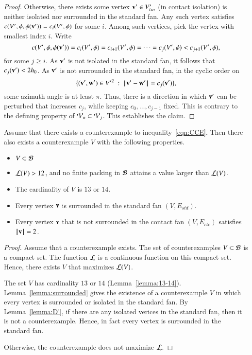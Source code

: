 \begin{proof}
 Otherwise,
there exists some vertex ${\mathbf v}'\in V'_{iso}$ (in contact isolation)
is neither isolated nor surrounded in the standard fan.  
Any such vertex satisfies $c(V',\phi,\phi({\mathbf v}'))=c_i(V',\phi)$ for some $i$.
Among such vertices, pick the vertex with smallest index
$i$.  Write 
$$
c(V',\phi,\phi({\mathbf v}')) = c_i(V',\phi) = c_{i+1}(V',\phi) =\cdots= c_j(V',\phi) < c_{j+1}(V',\phi),
$$
for some $j\ge i$.  As ${\mathbf v}'$ is not isolated in the
standard fan, it follows that $c_j({\mathbf v}') < 2{h_0}$.  As ${\mathbf v}'$ is not surrounded in the standard fan,
in the cyclic order on
$$
\{({\mathbf v}',{\mathbf w}')\in V'^2 \ :\  {\hskip0.1em|\hskip-0.15em|\hskip0.1em}{\mathbf v}' - {\mathbf w}'{\hskip0.1em|\hskip-0.15em|\hskip0.1em} = c_j({\mathbf v}')\},
$$
some azimuth angle is at least $\pi$.
Thus, there is a direction in which ${\mathbf v}'$ can be perturbed
that increases $c_j$, while keeping $c_0,\ldots,c_{j-1}$
fixed.  This is contrary to the defining property of
${\mathcal V}_n\subset{\mathcal V}_j$.  This establishes the claim.
%
\end{proof}



\begin{lemma}\label{lemma:CE} 
Assume that there exists a counterexample to inequality~\ref{eqn:CCE}.  Then there also exists a counterexample $V$ with the following properties.
\begin{itemize}
\item $V\subset {\mathcal B}$
\item ${\mathcal L}(V) > 12$, and no finite packing in ${\mathcal B}$ attains a value larger than ${\mathcal L}(V)$.
\item The cardinality of $V$ is $13$ or $14$.
\item Every vertex ${\mathbf v}$ is surrounded in the standard fan $(V,E_{std})$.
\item Every vertex ${\mathbf v}$ that is not surrounded in the contact
fan $(V,E_{ctc})$ satisfies ${{\hskip0.1em|\hskip-0.15em|\hskip0.1em}{\mathbf v}{\hskip0.1em|\hskip-0.15em|\hskip0.1em}}=2$.
\end{itemize}
\end{lemma}

\begin{proof}  Assume that a counterexample exists.
The set of counterexamples $V\subset{\mathcal B}$ is a compact set.  The function ${\mathcal L}$ is a continuous function on this compact set.  Hence, there exists $V$ that maximizes ${\mathcal L}(V)$.

The set $V$ has cardinality $13$ or $14$ (Lemma~\ref{lemma:13-14}). Lemma~\ref{lemma:surrounded} gives the existence of a counterexample $V$ in which every vertex is surrounded or isolated in the standard fan.  By Lemma~\ref{lemma:D'}, if there are any isolated verices in the standard fan, then it is not a counterexample.  Hence, in fact every vertex is surrounded in the standard fan.  

  Otherwise, the counterexample does not maximize ${\mathcal L}$.
%
\end{proof}


